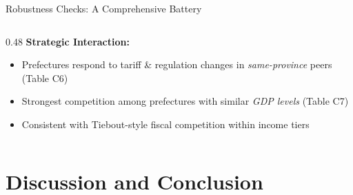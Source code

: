 \documentclass[10pt,aspectratio=169,t]{beamer}
\newcommand{\gmark}[1]{\textcolor{resultgreen}{#1}}
\begin{document}
\begin{frame}{Robustness Checks: A Comprehensive Battery}
\begin{columns}[T]
\begin{column}{0.48\textwidth}
\bigskip
\textbf{Strategic Interaction:}
\begin{itemize}\setlength{\itemsep}{3pt}
    \item[\gmark{$\checkmark$}] Prefectures respond to tariff \& regulation changes in \textit{same-province} peers (Table C6)
    \item[\gmark{$\checkmark$}] Strongest competition among prefectures with similar \textit{GDP levels} (Table C7)
    \item Consistent with Tiebout-style fiscal competition within income tiers
\end{itemize}
\end{column}
\end{columns}
\end{frame}

\section{Discussion and Conclusion}
\end{document}
